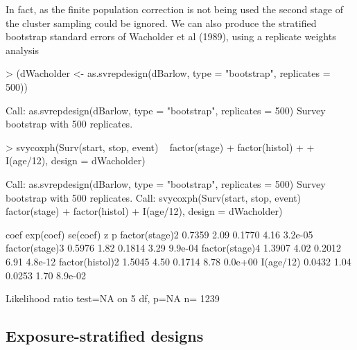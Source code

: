 \documentclass{article}
\begin{document}
In fact, as the finite population correction is not being used the second stage of the cluster sampling could be ignored.   We can also produce the stratified bootstrap standard errors of Wacholder et al (1989), using a replicate weights analysis

\begin{Schunk}
\begin{Sinput}
> (dWacholder <- as.svrepdesign(dBarlow, type = "bootstrap", replicates = 500))
\end{Sinput}
\begin{Soutput}
Call: as.svrepdesign(dBarlow, type = "bootstrap", replicates = 500)
Survey bootstrap with 500 replicates.
\end{Soutput}
\begin{Sinput}
> svycoxph(Surv(start, stop, event) ~ factor(stage) + factor(histol) + 
+     I(age/12), design = dWacholder)
\end{Sinput}
\begin{Soutput}
Call: as.svrepdesign(dBarlow, type = "bootstrap", replicates = 500)
Survey bootstrap with 500 replicates.
Call:
svycoxph(Surv(start, stop, event) ~ factor(stage) + factor(histol) + 
    I(age/12), design = dWacholder)


                  coef exp(coef) se(coef)    z       p
factor(stage)2  0.7359      2.09   0.1770 4.16 3.2e-05
factor(stage)3  0.5976      1.82   0.1814 3.29 9.9e-04
factor(stage)4  1.3907      4.02   0.2012 6.91 4.8e-12
factor(histol)2 1.5045      4.50   0.1714 8.78 0.0e+00
I(age/12)       0.0432      1.04   0.0253 1.70 8.9e-02

Likelihood ratio test=NA  on 5 df, p=NA  n= 1239 
\end{Soutput}
\end{Schunk}


\subsection*{Exposure-stratified designs}
\end{document}
